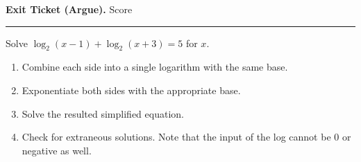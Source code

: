 \documentclass[twoside, 10pt]{article}
\begin{document}
\noindent
{\bf Exit Ticket (Argue).} Score \rule{2em}{0.4pt}

Solve $\log_2(x-1) + \log_2(x+3) = 5$ for $x$.
\begin{enumerate}[label = \textbf{Step \arabic*:}, leftmargin=*]
\item
Combine each side into a single logarithm with the same base.
\item
Exponentiate both sides with the appropriate base.
\item
Solve the resulted simplified equation.
\item Check for extraneous solutions. Note that the input of the log cannot be $0$ or negative as well.
\end{enumerate}
\end{document}

